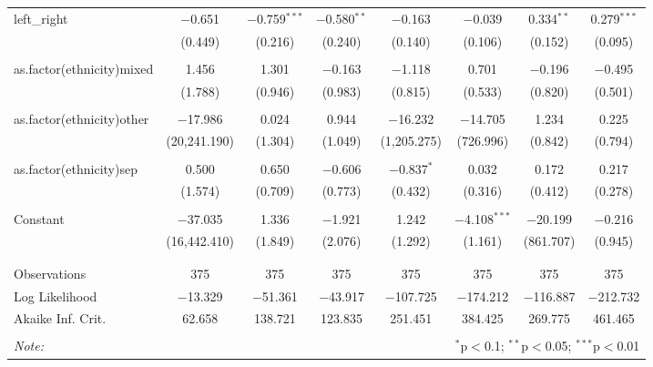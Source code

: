 \documentclass[12pt,letterpaper]{article}
\begin{document}
\begin{table}[!htbp]
\begin{adjustbox}{max width=\textwidth}
\begin{tabular}{@{\extracolsep{5pt}}lccccccc}
		left\_right & $-$0.651 & $-$0.759$^{***}$ & $-$0.580$^{**}$ & $-$0.163 & $-$0.039 & 0.334$^{**}$ & 0.279$^{***}$ \\ 
		& (0.449) & (0.216) & (0.240) & (0.140) & (0.106) & (0.152) & (0.095) \\ 
		& & & & & & & \\ 
		as.factor(ethnicity)mixed & 1.456 & 1.301 & $-$0.163 & $-$1.118 & 0.701 & $-$0.196 & $-$0.495 \\ 
		& (1.788) & (0.946) & (0.983) & (0.815) & (0.533) & (0.820) & (0.501) \\ 
		& & & & & & & \\ 
		as.factor(ethnicity)other & $-$17.986 & 0.024 & 0.944 & $-$16.232 & $-$14.705 & 1.234 & 0.225 \\ 
		& (20,241.190) & (1.304) & (1.049) & (1,205.275) & (726.996) & (0.842) & (0.794) \\ 
		& & & & & & & \\ 
		as.factor(ethnicity)sep & 0.500 & 0.650 & $-$0.606 & $-$0.837$^{*}$ & 0.032 & 0.172 & 0.217 \\ 
		& (1.574) & (0.709) & (0.773) & (0.432) & (0.316) & (0.412) & (0.278) \\ 
		& & & & & & & \\ 
		Constant & $-$37.035 & 1.336 & $-$1.921 & 1.242 & $-$4.108$^{***}$ & $-$20.199 & $-$0.216 \\ 
		& (16,442.410) & (1.849) & (2.076) & (1.292) & (1.161) & (861.707) & (0.945) \\ 
		& & & & & & & \\ 
		\hline \\[-1.8ex] 
		Observations & 375 & 375 & 375 & 375 & 375 & 375 & 375 \\ 
		Log Likelihood & $-$13.329 & $-$51.361 & $-$43.917 & $-$107.725 & $-$174.212 & $-$116.887 & $-$212.732 \\ 
		Akaike Inf. Crit. & 62.658 & 138.721 & 123.835 & 251.451 & 384.425 & 269.775 & 461.465 \\ 
		\hline 
		\hline \\[-1.8ex] 
		\textit{Note:}  & \multicolumn{7}{r}{$^{*}$p$<$0.1; $^{**}$p$<$0.05; $^{***}$p$<$0.01} \\ 
	\end{tabular} 
	\end{adjustbox}
\end{table} 

\newpage
\end{document}
